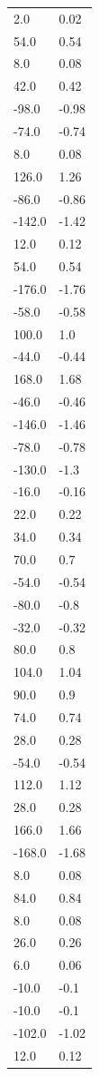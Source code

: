 \begin{longtable}{ll}
2.0 & 0.02 \\
54.0 & 0.54 \\
8.0 & 0.08 \\
42.0 & 0.42 \\
-98.0 & -0.98 \\
-74.0 & -0.74 \\
8.0 & 0.08 \\
126.0 & 1.26 \\
-86.0 & -0.86 \\
-142.0 & -1.42 \\
12.0 & 0.12 \\
54.0 & 0.54 \\
-176.0 & -1.76 \\
-58.0 & -0.58 \\
100.0 & 1.0 \\
-44.0 & -0.44 \\
168.0 & 1.68 \\
-46.0 & -0.46 \\
-146.0 & -1.46 \\
-78.0 & -0.78 \\
-130.0 & -1.3 \\
-16.0 & -0.16 \\
22.0 & 0.22 \\
34.0 & 0.34 \\
70.0 & 0.7 \\
-54.0 & -0.54 \\
-80.0 & -0.8 \\
-32.0 & -0.32 \\
80.0 & 0.8 \\
104.0 & 1.04 \\
90.0 & 0.9 \\
74.0 & 0.74 \\
28.0 & 0.28 \\
-54.0 & -0.54 \\
112.0 & 1.12 \\
28.0 & 0.28 \\
166.0 & 1.66 \\
-168.0 & -1.68 \\
8.0 & 0.08 \\
84.0 & 0.84 \\
8.0 & 0.08 \\
26.0 & 0.26 \\
6.0 & 0.06 \\
-10.0 & -0.1 \\
-10.0 & -0.1 \\
-102.0 & -1.02 \\
12.0 & 0.12 \\

\end{longtable}
